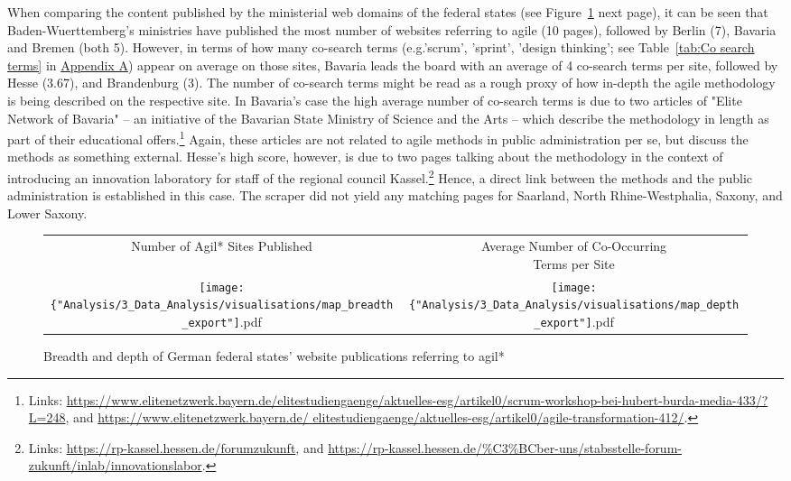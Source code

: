 When comparing the content published by the ministerial web domains of the federal states (see Figure~\ref{fig:map} next page), it can be seen that Baden-Wuerttemberg's ministries have published the most number of websites referring to agile (10 pages), followed by Berlin (7), Bavaria and Bremen (both 5). However, in terms of how many co-search terms (e.g.'scrum', 'sprint', 'design thinking'; see Table~\ref{tab:Co search terms} in \href{Appendix A}{Appendix A}) appear on average on those sites, Bavaria leads the board with an average of 4 co-search terms per site, followed by Hesse (3.67), and Brandenburg (3). The number of co-search terms might be read as a rough proxy of how in-depth the agile methodology is being described on the respective site. In Bavaria's case the high average number of co-search terms is due to two articles of "Elite Network of Bavaria" – an initiative of the Bavarian State Ministry of Science and the Arts – which describe the methodology in length as part of their educational offers.\footnote{Links: \href{https://www.elitenetzwerk.bayern.de/elitestudiengaenge/aktuelles-esg/artikel0/scrum-workshop-bei-hubert-burda-media-433/?L=248}{https://www.elitenetzwerk.bayern.de/elitestudiengaenge/aktuelles-esg/artikel0/scrum-workshop-bei-hubert-burda-media-433/?L=248}, and \href{https://www.elitenetzwerk.bayern.de/elitestudiengaenge/aktuelles-esg/artikel0/agile-transformation-412/}{https://www.elitenetzwerk.bayern.de/ elitestudiengaenge/aktuelles-esg/artikel0/agile-transformation-412/}.} Again, these articles are not related to agile methods in public administration per se, but discuss the methods as something external. Hesse's high score, however, is due to two pages talking about the methodology in the context of introducing an innovation laboratory for staff of the regional council Kassel.\footnote{Links: \href{https://rp-kassel.hessen.de/forumzukunft}{  https://rp-kassel.hessen.de/forumzukunft}, and \href{https://rp-kassel.hessen.de/\%C3\%BCber-uns/stabsstelle-forum-zukunft/inlab/innovationslabor}{https://rp-kassel.hessen.de/\%C3\%BCber-uns/stabsstelle-forum-zukunft/inlab/innovationslabor}.} Hence, a direct link between the methods and the public administration is established in this case. The scraper did not yield any matching pages for Saarland, North Rhine-Westphalia, Saxony, and Lower Saxony.
\begin{figure}[ht!]
	\centering
	\begin{tabular}{c c}
    Number of Agil* Sites Published & \makecell{Average Number of Co-Occurring \\ Terms per Site} \\
	\texttt{[image: \{"Analysis/3\_Data\_Analysis/visualisations/map\_breadth\_export"]}.pdf} &
	\texttt{[image: \{"Analysis/3\_Data\_Analysis/visualisations/map\_depth\_export"]}.pdf}
	\end{tabular}
	\setlength{\belowcaptionskip}{-10pt}
	\caption[Breadth and depth of German federal states' website publications referring to agil*]{Breadth and depth of German federal states' website publications referring to agil*}
	\label{fig:map}
\end{figure}

